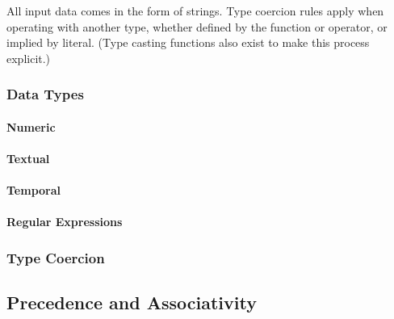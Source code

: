 All input data comes in the form of strings. Type coercion rules apply
when operating with another type, whether defined by the function or
operator, or implied by literal. (Type casting functions also exist to
make this process explicit.)

\subsubsection{Data Types}

\paragraph{Numeric}

\paragraph{Textual}

\paragraph{Temporal}

\paragraph{Regular Expressions}

\subsubsection{Type Coercion}

\subsection{Precedence and Associativity}
